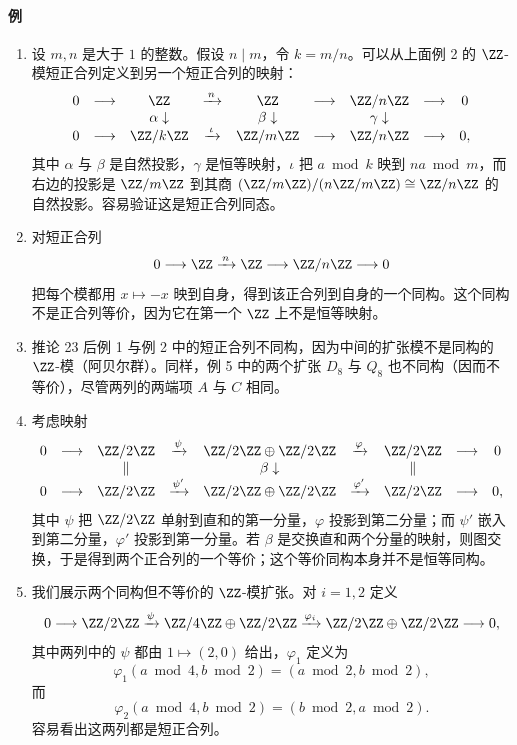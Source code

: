 \paragraph{例}
\begin{enumerate}[label=(\arabic*)]
\item 设 $m,n$ 是大于 $1$ 的整数。假设 $n\mid m$，令 $k=m/n$。可以从上面例 2 的 $\ZZ$-模短正合列定义到另一个短正合列的映射：
\[
\begin{array}{ccccccccc}
0&\longrightarrow&\ZZ&\xrightarrow{\,n\,}&\ZZ&\longrightarrow&\ZZ/n\ZZ&\longrightarrow&0\\
 &&\alpha\downarrow&&\beta\downarrow&&\gamma\downarrow&&\\
0&\longrightarrow&\ZZ/k\ZZ&\xrightarrow{\,\iota\,}&\ZZ/m\ZZ&\longrightarrow&\ZZ/n\ZZ&\longrightarrow&0,
\end{array}
\]
其中 $\alpha$ 与 $\beta$ 是自然投影，$\gamma$ 是恒等映射，$\iota$ 把 $a\bmod k$ 映到 $na\bmod m$，而右边的投影是 $\ZZ/m\ZZ$ 到其商 $(\ZZ/m\ZZ)/(n\ZZ/m\ZZ)\cong\ZZ/n\ZZ$ 的自然投影。容易验证这是短正合列同态。

\item 对短正合列
\[
0\longrightarrow \ZZ\xrightarrow{\,n\,}\ZZ\longrightarrow\ZZ/n\ZZ\longrightarrow0
\]
把每个模都用 $x\mapsto -x$ 映到自身，得到该正合列到自身的一个同构。这个同构不是正合列等价，因为它在第一个 $\ZZ$ 上不是恒等映射。

\item 推论 23 后例 1 与例 2 中的短正合列不同构，因为中间的扩张模不是同构的 $\ZZ$-模（阿贝尔群）。同样，例 5 中的两个扩张 $D_8$ 与 $Q_8$ 也不同构（因而不等价），尽管两列的两端项 $A$ 与 $C$ 相同。

\item 考虑映射
\[
\begin{array}{ccccccccc}
0&\longrightarrow&\ZZ/2\ZZ&\xrightarrow{\psi}&\ZZ/2\ZZ\oplus\ZZ/2\ZZ&\xrightarrow{\varphi}&\ZZ/2\ZZ&\longrightarrow&0\\
 &&\Vert&&\beta\downarrow&&\Vert&&\\
0&\longrightarrow&\ZZ/2\ZZ&\xrightarrow{\psi'}&\ZZ/2\ZZ\oplus\ZZ/2\ZZ&\xrightarrow{\varphi'}&\ZZ/2\ZZ&\longrightarrow&0,
\end{array}
\]
其中 $\psi$ 把 $\ZZ/2\ZZ$ 单射到直和的第一分量，$\varphi$ 投影到第二分量；而 $\psi'$ 嵌入到第二分量，$\varphi'$ 投影到第一分量。若 $\beta$ 是交换直和两个分量的映射，则图交换，于是得到两个正合列的一个等价；这个等价同构本身并不是恒等同构。

\item 我们展示两个同构但不等价的 $\ZZ$-模扩张。对 $i=1,2$ 定义
\[
0\longrightarrow \ZZ/2\ZZ\xrightarrow{\psi}\ZZ/4\ZZ\oplus\ZZ/2\ZZ\xrightarrow{\varphi_i}\ZZ/2\ZZ\oplus\ZZ/2\ZZ\longrightarrow0,
\]
其中两列中的 $\psi$ 都由 $1\mapsto (2,0)$ 给出，$\varphi_1$ 定义为
\[
\varphi_1(a\bmod4,b\bmod2)=(a\bmod2,b\bmod2),
\]
而
\[
\varphi_2(a\bmod4,b\bmod2)=(b\bmod2,a\bmod2).
\]
容易看出这两列都是短正合列。


\end{enumerate}
